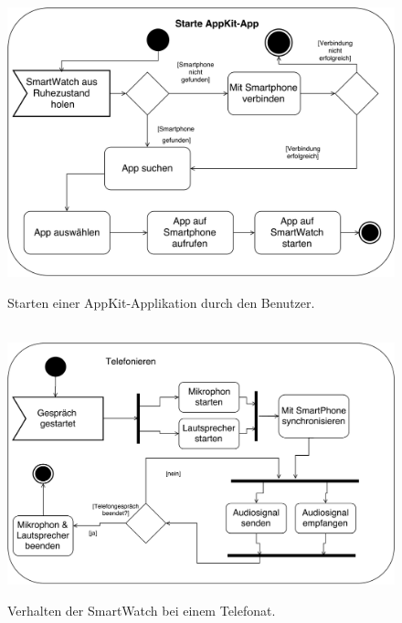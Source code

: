 \begin{appendices}
\begin{figure}[h]
\centering\
\includegraphics[width=\textwidth]{img/activityAppKit}
\caption{Starten einer AppKit-Applikation durch den Benutzer.}\label{fig:activityAppKit}
\end{figure}

\begin{figure}[h]
\centering\
\includegraphics[width=\textwidth]{img/activityTelefonieren}
\caption{Verhalten der SmartWatch bei einem Telefonat.}\label{fig:activityTelefonieren}
\end{figure}


\end{appendices}
